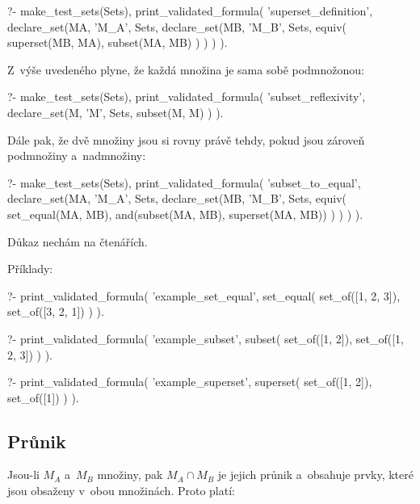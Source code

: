 \begin{prolog}
?-	make_test_sets(Sets),
	print_validated_formula(
		'superset_definition',
		declare_set(MA, 'M_A', Sets,
			declare_set(MB, 'M_B', Sets,
				equiv(
					superset(MB, MA),
					subset(MA, MB)
				)
			)
		)
	).
\end{prolog}

Z~výše uvedeného plyne, že každá množina je sama sobě podmnožonou:

\begin{prolog}
?-	make_test_sets(Sets),
	print_validated_formula(
		'subset_reflexivity',
		declare_set(M, 'M', Sets,
			subset(M, M)
		)
	).
\end{prolog}

Dále pak, že dvě množiny jsou si rovny právě tehdy, pokud jsou zároveň podmnožiny a~nadmnožiny:

\begin{prolog}
?-	make_test_sets(Sets),
	print_validated_formula(
		'subset_to_equal',
		declare_set(MA, 'M_A', Sets,
			declare_set(MB, 'M_B', Sets,
				equiv(
					set_equal(MA, MB),
					and(subset(MA, MB), superset(MA, MB))
				)
			)
		)
	).
\end{prolog}

Důkaz nechám na čtenářích.

Příklady:

\begin{prolog}
?-	print_validated_formula(
		'example_set_equal',
		set_equal(
			set_of([1, 2, 3]),
			set_of([3, 2, 1])
		)
	).
\end{prolog}
\begin{prolog}
?-	print_validated_formula(
		'example_subset',
		subset(
			set_of([1, 2]),
			set_of([1, 2, 3])
		)
	).
\end{prolog}
\begin{prolog}
?-	print_validated_formula(
		'example_superset',
		superset(
			set_of([1, 2]),
			set_of([1])
		)
	).
\end{prolog}

\subsection{Průnik}
Jsou-li \(M_A\) a~\(M_B\) množiny, pak \(M_A \cap M_B\) je jejich průnik a~obsahuje prvky, které jsou obsaženy v~obou množinách. Proto platí:

